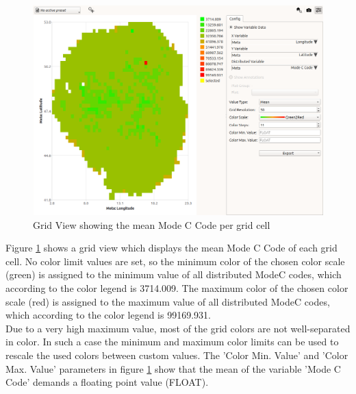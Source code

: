 \begin{figure}[H]
    \hspace*{-2cm}
    \includegraphics[width=18cm,frame]{figures/grid_modec_mean_nolimits.png}
  \caption{Grid View showing the mean Mode C Code per grid cell}
  \label{fig:grid_view_color_example1}
\end{figure}

Figure \ref{fig:grid_view_color_example1} shows a grid view which displays the mean Mode C Code of each grid cell.
No color limit values are set, so the minimum color of the chosen color scale (green) is assigned to the minimum 
value of all distributed ModeC codes, which according to the color legend is 3714.009. 
The maximum color of the chosen color scale (red) is assigned to the maximum 
value of all distributed ModeC codes, which according to the color legend is 99169.931. \\

Due to a very high maximum value, most of the grid colors are not well-separated in color.
In such a case the minimum and maximum color limits can be used to rescale the used colors
between custom values. The 'Color Min. Value' and 'Color Max. Value' parameters in figure \ref{fig:grid_view_color_example1}
show that the mean of the variable 'Mode C Code' demands a floating point value (FLOAT). 


